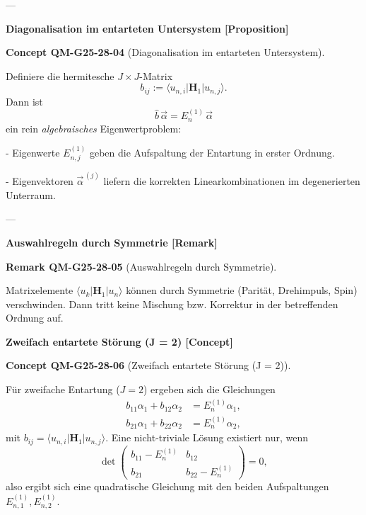 \documentclass[10pt, letterpaper]{article}
\newcommand{\CustomHeading}[3]{%
  \par\medskip\noindent%
  \textbf{#1 #2} \textnormal{(#3)}.\enskip%
}
\newenvironment{REM}[2]{\begin{unitbox}\CustomHeading{Remark}{#1}{#2}}{\end{unitbox}}
\newenvironment{CONC}[2]{\begin{unitbox}\CustomHeading{Concept}{#1}{#2}}{\end{unitbox}}
\begin{document}
---

\textbf{Diagonalisation im entarteten Untersystem [Proposition]}

\begin{CONC}{QM-G25-28-04}{Diagonalisation im entarteten Untersystem}
Definiere die hermitesche $J\times J$-Matrix
\[
b_{ij} := \langle u_{n,i}|\mathbf{H}_1|u_{n,j}\rangle.
\]
Dann ist
\[
\hat b\,\vec\alpha = E_{n}^{(1)}\,\vec\alpha
\]
ein rein \emph{algebraisches} Eigenwertproblem:

- Eigenwerte $E_{n,j}^{(1)}$ geben die Aufspaltung der Entartung in erster Ordnung.  

- Eigenvektoren $\vec\alpha^{\,(j)}$ liefern die korrekten Linearkombinationen im degenerierten Unterraum.
\end{CONC}

---

\textbf{Auswahlregeln durch Symmetrie [Remark]}

\begin{REM}{QM-G25-28-05}{Auswahlregeln durch Symmetrie}
Matrixelemente $\langle u_k|\mathbf{H}_1|u_n\rangle$ können durch Symmetrie (Parität, Drehimpuls, Spin) verschwinden. Dann tritt keine Mischung bzw. Korrektur in der betreffenden Ordnung auf.
\end{REM}



\textbf{Zweifach entartete Störung (J = 2) [Concept]}

\begin{CONC}{QM-G25-28-06}{Zweifach entartete Störung (J = 2)}
Für zweifache Entartung ($J=2$) ergeben sich die Gleichungen
\[
\begin{aligned}
b_{11}\alpha_1 + b_{12}\alpha_2 &= E_n^{(1)}\alpha_1,\\
b_{21}\alpha_1 + b_{22}\alpha_2 &= E_n^{(1)}\alpha_2,
\end{aligned}
\]
mit
\(
b_{ij}=\langle u_{n,i}|\mathbf{H}_1|u_{n,j}\rangle.
\)
Eine nicht-triviale Lösung existiert nur, wenn
\[
\det\!
\begin{pmatrix}
b_{11}-E_n^{(1)} & b_{12}\\
b_{21} & b_{22}-E_n^{(1)}
\end{pmatrix}
= 0,
\]
also ergibt sich eine quadratische Gleichung mit den beiden Aufspaltungen
\(E_{n,1}^{(1)},E_{n,2}^{(1)}\).
\end{CONC}
\end{document}
